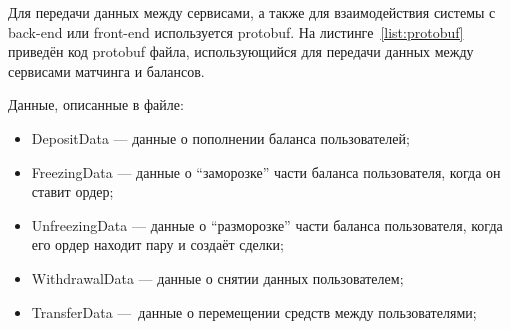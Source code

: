 Для передачи данных между сервисами, а также для взаимодействия системы с back-end или front-end используется protobuf. На листинге~\ref{list:protobuf} приведён код protobuf файла, использующийся для передачи данных между сервисами матчинга и балансов.



Данные, описанные в файле:
\begin{itemize}
    \item DepositData — данные о пополнении баланса пользователей;
    \item FreezingData — данные о ``заморозке'' части баланса пользователя, когда он ставит ордер;
    \item UnfreezingData — данные о ``разморозке'' части баланса пользователя, когда его ордер находит пару и создаёт сделки;
    \item WithdrawalData — данные о снятии данных пользователем;
    \item TransferData — данные о перемещении средств между пользователями;
\end{itemize}
